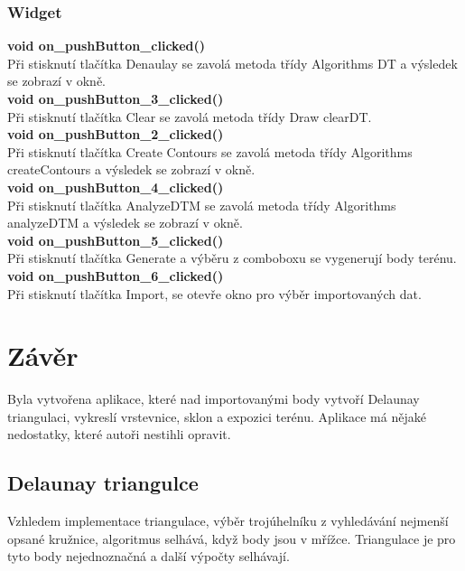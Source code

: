 \documentclass[a4paper, 12pt]{article}
\begin{document}
\subsubsection{Widget}

\textbf{void on\_pushButton\_clicked()}\\
Při stisknutí tlačítka Denaulay se zavolá metoda třídy Algorithms DT a výsledek se zobrazí v okně.
\\

\textbf{void on\_pushButton\_3\_clicked()}\\
Při stisknutí tlačítka Clear se zavolá metoda třídy Draw clearDT.
\\

\textbf{void on\_pushButton\_2\_clicked()}\\
Při stisknutí tlačítka Create Contours se zavolá metoda třídy Algorithms createContours a výsledek se zobrazí v okně.
\\

\textbf{void on\_pushButton\_4\_clicked()}\\
Při stisknutí tlačítka AnalyzeDTM se zavolá metoda třídy Algorithms analyzeDTM a výsledek se zobrazí v okně.
\\

\textbf{void on\_pushButton\_5\_clicked()}\\
Při stisknutí tlačítka Generate a výběru z comboboxu se vygenerují body terénu.
\\

\textbf{void on\_pushButton\_6\_clicked()}\\
Při stisknutí tlačítka Import, se otevře okno pro výběr importovaných dat.
\\



\clearpage
\section{Závěr}
Byla vytvořena aplikace, které nad importovanými body vytvoří Delaunay triangulaci, vykreslí vrstevnice, sklon a expozici terénu. Aplikace má nějaké nedostatky, které autoři nestihli opravit.\\

\subsection{Delaunay triangulce}
Vzhledem implementace triangulace, výběr trojúhelníku z vyhledávání nejmenší opsané kružnice, algoritmus selhává, když body jsou v mřížce. Triangulace je pro tyto body nejednoznačná a další výpočty selhávají.\\
\end{document}
